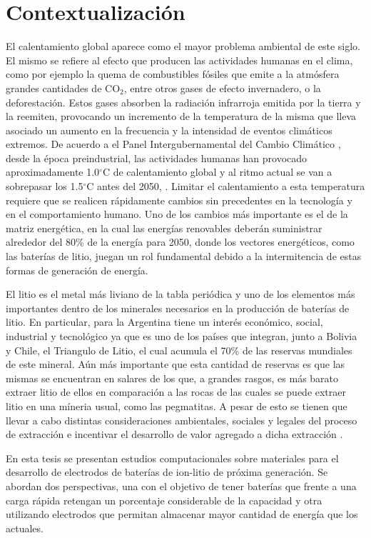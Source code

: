 \section{Contextualización}

El calentamiento global aparece como el mayor problema ambiental de este siglo.
El mismo se refiere al efecto que producen las actividades humanas en el clima, 
como por ejemplo la quema de combustibles fósiles que emite 
a la atmósfera grandes cantidades de CO$_2$, entre otros gases de efecto 
invernadero, o la deforestación. Estos gases absorben la radiación infrarroja emitida por la tierra y la reemiten, 
provocando un incremento de la temperatura de la misma que lleva asociado un 
aumento en la frecuencia y la intensidad de eventos climáticos extremos. %
De acuerdo a el Panel Intergubernamental del Cambio Climático 
\cite{IPCC}, desde la época preindustrial, las actividades humanas han provocado 
aproximadamente 1.0$^{\circ}$C de calentamiento global y al ritmo actual se van 
a sobrepasar los 1.5$^{\circ}$C antes del 2050, . Limitar el 
calentamiento a esta temperatura requiere que se realicen rápidamente cambios 
sin precedentes en la tecnología y en el comportamiento humano. Uno de los 
cambios más importante es el de la matriz energética, en la cual las energías 
renovables deberán suministrar alrededor del 80\% de la energía para 2050, donde 
los vectores energéticos, como las baterías de litio, juegan un rol fundamental 
debido a la intermitencia de estas formas de generación de energía.

El litio es el metal más liviano de la tabla periódica y uno de los elementos más
importantes dentro de los minerales necesarios en la producción de baterías de
litio. En particular, para la Argentina tiene un interés económico, social, 
industrial y tecnológico ya que es uno de los países que integran, junto a 
Bolivia y Chile, el Triangulo de Litio, el cual acumula el 70\% de las reservas 
mundiales de este mineral. Aún más importante que esta cantidad de reservas es 
que las mismas se encuentran en salares de los que, a grandes rasgos, es más barato
extraer litio de ellos en comparación a las rocas de las cuales se puede extraer 
litio en una míneria usual, como las pegmatitas. A pesar de esto se tienen que
llevar a cabo distintas consideraciones ambientales, sociales y legales del 
proceso de extracción e incentivar el desarrollo de valor agregado a dicha 
extracción \cite{gutierrez2022, petavratzi2022, obaya2021, romero2021, 
heredia2020, fornillo2019}.

En esta tesis se presentan estudios computacionales sobre materiales para el 
desarrollo de electrodos de baterías de ion-litio de próxima generación. Se 
abordan dos perspectivas, una con el objetivo de tener baterías que frente a una 
carga rápida retengan un porcentaje considerable de la capacidad y otra 
utilizando electrodos que permitan almacenar mayor cantidad de energía que los 
actuales.
